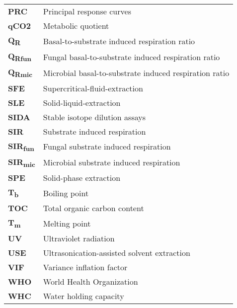 \begin{normalsize}
\begin{longtable}{ll}
\textbf{PRC} & Principal response curves\\
\textbf{qCO2} & Metabolic quotient\\
\textbf{Q\textsubscript{R}} & Basal-to-substrate induced respiration ratio\\
\textbf{Q\textsubscript{Rfun}} & Fungal basal-to-substrate induced respiration ratio\\
\textbf{Q\textsubscript{Rmic}} & Microbial basal-to-substrate induced respiration ratio\\
\textbf{SFE} & Supercritical-fluid-extraction\\
\textbf{SLE} & Solid-liquid-extraction\\
\textbf{SIDA} & Stable isotope dilution assays\\
\textbf{SIR} & Substrate induced respiration\\
\textbf{SIR\textsubscript{fun}} & Fungal substrate induced respiration\\
\textbf{SIR\textsubscript{mic}} & Microbial substrate induced respiration\\
\textbf{SPE} & Solid-phase extraction\\
\textbf{T\textsubscript{b}} & Boiling point\\
\textbf{TOC} & Total organic carbon content\\
\textbf{T\textsubscript{m}} & Melting point\\
\textbf{UV} & Ultraviolet radiation\\
\textbf{USE} & Ultrasonication-assisted solvent extraction\\
\textbf{VIF} & Variance inflation factor\\
\textbf{WHO} & World Health Organization\\
\textbf{WHC} & Water holding capacity\\
\end{longtable}
\end{normalsize}
